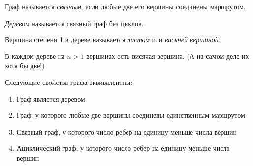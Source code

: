 \begin{Def}
	Граф называется \emph{связным}, если любые две его вершины соединены маршрутом.
\end{Def}

\begin{Def}
	\emph{Деревом} называется связный граф без циклов.
\end{Def}

\begin{Def}
	Вершина степени 1 в дереве называется \emph{листом} или \emph{висячей вершиной}.
\end{Def}

\begin{note}
	В каждом дереве на $n>1$ вершинах есть висячая вершина. (А на самом деле их хотя бы две!)
\end{note}

\begin{theorem} \label{equivalences}
	Следующие свойства графа эквивалентны:
	\begin{enumerate}
		\item Граф является деревом
		\item Граф, у которого любые две вершины соединены единственным маршрутом
		\item Связный граф, у которого число ребер на единицу меньше числа вершин
		\item Ациклический граф, у которого число ребер на единицу меньше числа вершин
	\end{enumerate}
\end{theorem}

